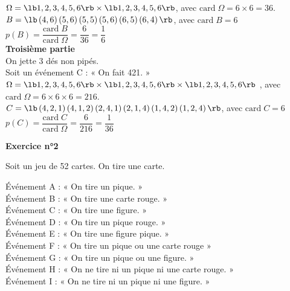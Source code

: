 $\Omega = \lb 1,2,3,4,5,6 \rb \times \lb 1,2,3,4,5,6 \rb$, avec $\mathrm{card} \; \Omega = 6 \times 6 = 36$. \\

$B = \lb \left(4,6\right) \left(5,6\right) \left(5,5\right) \left(5,6\right) \left(6,5\right) \left(6,4\right) \rb $, avec $\mathrm{card} \; B = 6 $ \\

$p\left(B\right) = \dfrac{\mathrm{card} \; B}{\mathrm{card} \; \Omega} = \dfrac{6}{36} = \dfrac{1}{6} $ \\

\textbf{Troisième partie} \\

On jette 3 dés non pipés. \\ Soit un événement C : « On fait 421. » \\

$\Omega = \lb 1,2,3,4,5,6 \rb \times \lb 1,2,3,4,5,6 \rb \times \lb 1,2,3,4,5,6 \rb$ , avec $\mathrm{card} \; \Omega = 6 \times 6 \times 6 = 216$. \\

$C = \lb \left(4,2,1\right) \left(4,1,2\right) \left(2,4,1\right) \left(2,1,4\right) \left(1,4,2\right) \left(1,2,4\right) \rb $, avec $\mathrm{card} \; C = 6 $ \\

$p\left(C\right) = \dfrac{\mathrm{card} \; C}{\mathrm{card} \; \Omega} = \dfrac{6}{216} = \dfrac{1}{36} $ \\

\newpage

\vspace*{-2cm}

\textbf{Exercice n°2}

Soit un jeu de 52 cartes. On tire une carte.

Événement A : « On tire un pique. » \\
Événement B : « On tire une carte rouge. » \\
Événement C : « On tire une figure. » \\
Événement D : « On tire un pique rouge. » \\
Événement E : « On tire une figure pique. » \\
Événement F : « On tire un pique ou une carte rouge » \\
Événement G : « On tire un pique ou une figure. » \\
Événement H : « On ne tire ni un pique ni une carte rouge. » \\
Événement I : « On ne tire ni un pique ni une figure. » \\

